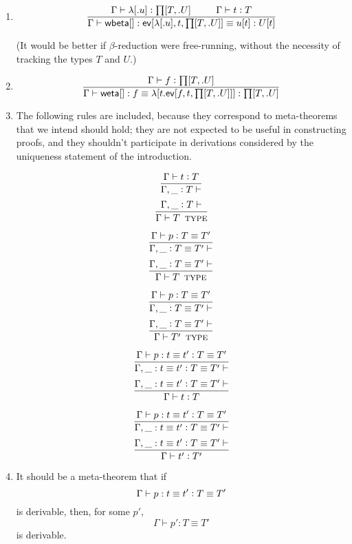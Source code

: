 \documentclass[11pt]{article}
\newcommand{\eqd}{\equiv}
\newcommand\spc{{\hskip 26pt}}
\newcommand{\ccolon}{\vcentcolon}
\newcommand{\ccheck}{\vcentcolon}            %
\newcommand{\TYPE}{\mathop{\text{ \sc type}}}
\newcommand{\Okay}{\mathop{\text{ \sc okay}}}
\newcommand{\Context}{\vdash\Okay}
\renewcommand{\Context}{\vdash}
\newcommand{\ha}[2]{#1[#2]}
\newcommand{\weta}{{\sf weta}}
\newcommand{\annot}{{\sf annot}}
\newcommand{\haa}[2]{\ha\annot{#1,#2}}
\renewcommand{\haa}[2]{#1}
\newcommand{\ev}{{\sf ev}}
\newcommand{\wbeta}{{\sf wbeta}}
\newcommand{\var}{\char`_}
\begin{document}
\begin{enumerate}
\item 
\[\frac{
  \Gamma \vdash \ha\lambda{.u} \ccheck {\ha\prod{T,.U}}
  \spc
  \Gamma \vdash t \ccheck{T} 
  }{
  \Gamma \vdash \ha\wbeta{} : \ha\ev{\ha\lambda{.u},t,{\ha\prod{T,.U}}} \eqd u[\haa{t}{T}] : U[\haa{t}{T}]
}\]


(It would be better if $\beta$-reduction were free-running, without the
necessity of tracking the types $T$ and $U$.)

\item 
\[
  \frac{\Gamma \vdash f \ccheck{\ha\prod{T,.U}}}
       {\Gamma \vdash \ha\weta{} : f \eqd \ha\lambda{t.\ha\ev{f,t,{\ha\prod{T,.U}}}} : \ha\prod{T,.U}
       }
\]

\item
The following rules are included, because they correspond to meta-theorems that
we intend should hold; they are not expected to be useful in constructing
proofs, and they shouldn't participate in derivations considered by the
uniqueness statement of the introduction.

\[
  \frac{\Gamma \vdash t \ccolon T}
       {\Gamma, \var \ccolon T \Context}
\]
\[
  \frac{\Gamma, \var \ccolon T \Context}
       {\Gamma \vdash T \TYPE}
\]

\[
  \frac{\Gamma \vdash p \ccolon T \eqd T'}
       {\Gamma, \var \ccolon T \eqd T' \Context}
\]
\[
  \frac{\Gamma, \var \ccolon T \eqd T' \Context}
       {\Gamma \vdash T \TYPE}
\]

\[
  \frac{\Gamma \vdash p \ccolon T \eqd T'}
       {\Gamma, \var \ccolon T \eqd T' \Context}
\]
\[
  \frac{\Gamma, \var \ccolon T \eqd T' \Context}
       {\Gamma \vdash T' \TYPE}
\]

\[
  \frac{\Gamma \vdash p : t \eqd t' \ccolon T \eqd T'}
       {\Gamma, \var : t \eqd t' \ccolon T \eqd T' \Context}
\]
\[
  \frac{\Gamma, \var : t \eqd t' \ccolon T \eqd T' \Context}
       {\Gamma \vdash t \ccolon T}
\]

\[
  \frac{\Gamma \vdash p : t \eqd t' \ccolon T \eqd T'}
       {\Gamma, \var : t \eqd t' \ccolon T \eqd T' \Context}
\]
\[
  \frac{\Gamma, \var : t \eqd t' \ccolon T \eqd T' \Context}
       {\Gamma \vdash t' \ccolon T'}
\]

\item
It should be a meta-theorem that if
\[{\Gamma \vdash p : t \eqd t' \ccolon T \eqd T'}\]
is derivable, then, for some $p'$,
\[{\Gamma \vdash p' : T \eqd T'}\]
is derivable.

\end{enumerate}



\end{document}
